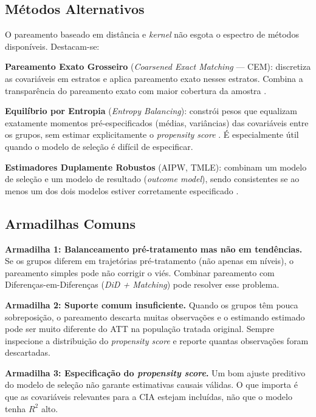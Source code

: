 \documentclass[12pt,a4paper]{article}
\begin{document}
\subsection{Métodos Alternativos}

O pareamento baseado em distância e \textit{kernel} não esgota o espectro de métodos disponíveis. Destacam-se:

\textbf{Pareamento Exato Grosseiro} (\textit{Coarsened Exact Matching} --- CEM): discretiza as covariáveis em estratos e aplica pareamento exato nesses estratos. Combina a transparência do pareamento exato com maior cobertura da amostra \citep{IacusKingPorro2012}.

\textbf{Equilíbrio por Entropia} (\textit{Entropy Balancing}): constrói pesos que equalizam exatamente momentos pré-especificados (médias, variâncias) das covariáveis entre os grupos, sem estimar explicitamente o \textit{propensity score} \citep{Hainmueller2012}. É especialmente útil quando o modelo de seleção é difícil de especificar.

\textbf{Estimadores Duplamente Robustos} (AIPW, TMLE): combinam um modelo de seleção e um modelo de resultado (\textit{outcome model}), sendo consistentes se ao menos um dos dois modelos estiver corretamente especificado \citep{ChernozhukovEtAl2018}.

\subsection{Armadilhas Comuns}

\textbf{Armadilha 1: Balanceamento pré-tratamento mas não em tendências.} Se os grupos diferem em trajetórias pré-tratamento (não apenas em níveis), o pareamento simples pode não corrigir o viés. Combinar pareamento com Diferenças-em-Diferenças (\textit{DiD + Matching}) pode resolver esse problema.

\textbf{Armadilha 2: Suporte comum insuficiente.} Quando os grupos têm pouca sobreposição, o pareamento descarta muitas observações e o estimando estimado pode ser muito diferente do ATT na população tratada original. Sempre inspecione a distribuição do \textit{propensity score} e reporte quantas observações foram descartadas.

\textbf{Armadilha 3: Especificação do \textit{propensity score}.} Um bom ajuste preditivo do modelo de seleção não garante estimativas causais válidas. O que importa é que as covariáveis relevantes para a CIA estejam incluídas, não que o modelo tenha $R^2$ alto.
\end{document}
